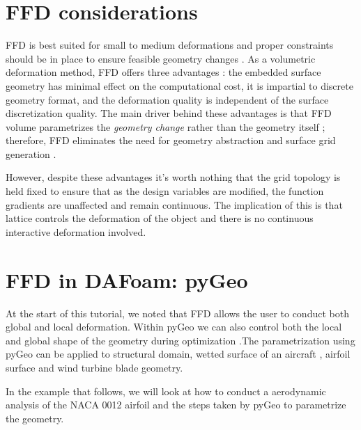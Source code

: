 \documentclass[12pt]{article}
\begin{document}
\section{FFD considerations}
FFD is best suited for small to medium deformations \cite{Samareh2004} and proper constraints should be in place to ensure feasible geometry changes \cite{Anderson2012}. As a volumetric deformation method, FFD offers three advantages \cite{Anderson2012}: the embedded surface geometry has minimal effect on the computational cost, it is impartial to discrete geometry format, and the deformation quality is independent of the surface discretization quality. The main driver behind these advantages is that FFD volume parametrizes the \emph{geometry change} rather than the geometry itself \cite{kenway}; therefore, FFD eliminates the need for geometry abstraction and surface grid generation \cite{Samareh2004}. \vspace{4mm}

\noindent However, despite these advantages it's worth nothing that the grid topology is held fixed to ensure that as the design variables are modified, the function gradients are unaffected and remain continuous\cite{kenway}. The implication of this is that lattice controls the deformation of the object and there is no continuous interactive deformation involved. 

\section{FFD in DAFoam: pyGeo}
At the start of this tutorial, we noted that FFD allows the user to conduct both global and local deformation. Within pyGeo we can also control both the local and global shape of the geometry during optimization \cite{He2018}.The parametrization using pyGeo can be applied to structural domain, wetted surface of an aircraft \cite{kenway}, airfoil surface and wind turbine blade geometry.\vspace{4mm} 

\noindent In the example that follows, we will look at how to conduct a aerodynamic analysis of the NACA 0012 airfoil and the steps taken by pyGeo to parametrize the geometry. 
\end{document}
